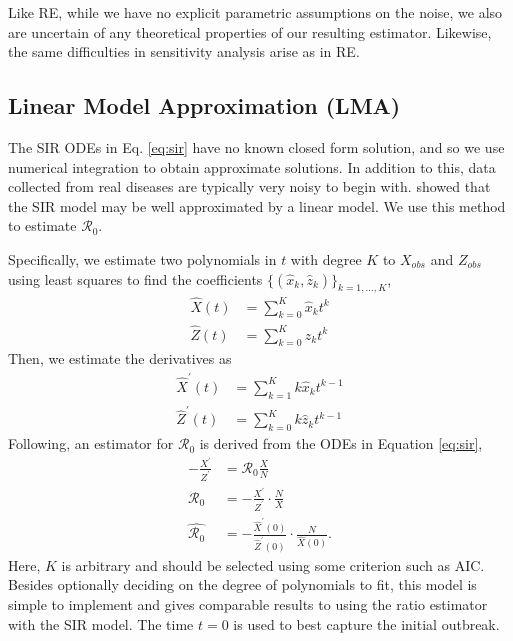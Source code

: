 \documentclass[12pt]{article}
\newcommand{\rr}{\ensuremath{\mathcal{R}_0}}
\begin{document}
Like RE, while we have no explicit parametric assumptions on the noise, we also are uncertain of any theoretical properties of our resulting estimator.  Likewise, the same difficulties in sensitivity analysis arise as in RE.



\subsection{Linear Model Approximation (LMA)}\label{linear-model-approximation-degree-10}

The SIR ODEs in Eq. \ref{eq:sir} have no known closed form solution, and so we use numerical integration to obtain approximate solutions.  In addition to this, data collected from real diseases are typically very noisy to begin with.  \cite{chang2017} showed that the SIR model may be well approximated by a linear model.  We use this method to estimate $\rr$.

Specifically, we estimate two polynomials in \(t\) with degree $K$  to \(X_{obs}\)
and \(Z_{obs}\) using least squares to find the coefficients $\{(\hat{x}_k,
\hat{z}_k)\}_{k=1, \dots, K}$,
\begin{align*}
\hat{X}(t) &= \sum_{k=0}^K \hat{x}_k t^k\\
{\hat{Z}}(t) &= \sum_{k=0}^K \hat{z}_k t^k
\end{align*}
Then, we estimate the derivatives as
\begin{align*}
\hat{X}^\prime(t) &= \sum_{k=1}^K k \hat{x}_k t^{k-1}\\
\hat{Z}^\prime(t) &= \sum_{k=0}^K k \hat{z}_k t^{k-1}
\end{align*}
Following,  an estimator for \(\rr\) is derived from the ODEs in Equation \eqref{eq:sir},
\begin{align}
  - \frac{X^\prime}{Z^\prime}&= \rr \frac{X}{N} \nonumber\\
  \rr &=       -\frac{X^\prime}{
        Z^\prime} \cdot \frac{N}{X} \nonumber\\
  \hat{\rr} &= -\frac{\hat{X}^\prime(0)}{ \hat{Z}^\prime(0)} \cdot \frac{N}{\hat{X}(0)}. \nonumber
  \end{align}
  Here, $K$ is arbitrary and should be selected using some criterion such as AIC.  Besides optionally deciding on the degree of polynomials to fit, this model is simple to implement and gives comparable results to using the ratio estimator with the SIR model.  The time $t=0$ is used to best capture the initial outbreak.
\end{document}
